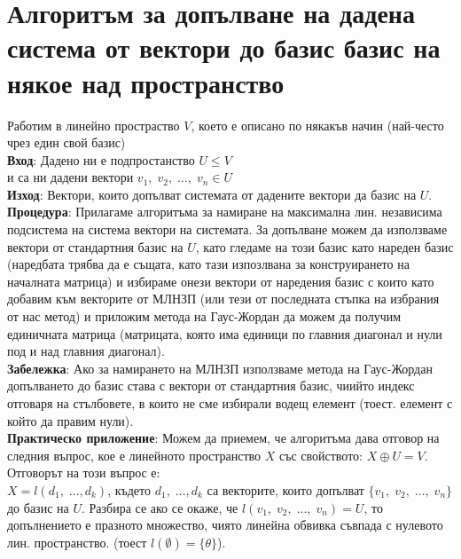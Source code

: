 \documentclass[12pt]{article}
\begin{document}
\section*{Алгоритъм за допълване на дадена система от вектори до базис базис на някое над пространство}

Работим в линейно простраство $V$, което е описано по някакъв начин
(най-често чрез един свой базис) \\

\textbf{Вход}: Дадено ни е подпростанство $U \leq V$ \\
и са ни дадени вектори $v_1, \; v_2, \; \dots, \; v_n \in U$ \\

\textbf{Изход}: Вектори, които допълват системата от дадените вектори да базис на $U$. \\

\textbf{Процедура}: Прилагаме алгоритъма за намиране на максимална лин. независима подсистема на система вектори
на системата. За допълване можем да използваме вектори от стандартния базис на $U$, като гледаме на този базис като
нареден базис (наредбата трябва да е същата, като тази изпозлвана за конструирането на началната матрица) и избираме
онези вектори от наредения базис с които като добавим към векторите от МЛНЗП (или тези от последната стъпка на избрания от нас метод)
и приложим метода на Гаус-Жордан да можем да получим единичната матрица (матрицата, която има единици по главния диагонал и нули под и над главния диагонал). \\

\textbf{Забележка}: Ако за намирането на МЛНЗП използваме метода на Гаус-Жордан допълването до базис става с
вектори от стандартния базис, чиийто индекс отговаря на стълбовете, в които не сме избирали водещ елемент (тоест. елемент с който да правим нули). \\

\textbf{Практическо приложение}: Можем да приемем, че алгоритъма дава отговор на следния въпрос,
кое е линейното пространство $X$ със свойството: $X \oplus U = V$. Отговорът на този въпрос е: \\

$X = l(d_1, \; \dots, d_k)$, където $d_1, \; \dots, d_k$ са векторите, които допълват $\{v_1, \; v_2, \; \dots, \; v_n\}$
до базис на $U$. Разбира се ако се окаже, че $l(v_1, \; v_2, \; \dots, \; v_n) = U$, то допълнението е празното множество,
чиято линейна обвивка съвпада с нулевото лин. пространство. (тоест $l(\emptyset) = \{\theta\}$). \\
\end{document}
